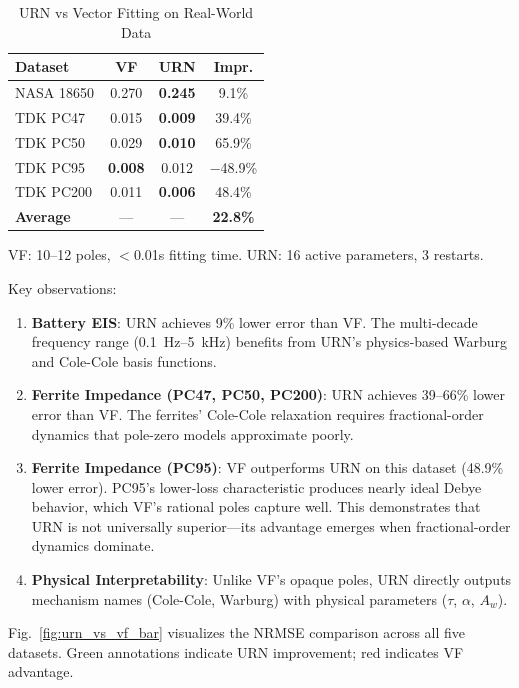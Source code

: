 \documentclass{ieeeaccess}
\begin{document}
\begin{table}[!t]
\caption{URN vs Vector Fitting on Real-World Data}
\label{tab:urn_vs_vf}
\centering
\footnotesize
\begin{tabular}{@{}lccc@{}}
\toprule
\textbf{Dataset} & \textbf{VF} & \textbf{URN} & \textbf{Impr.} \\
\midrule
NASA 18650 & 0.270 & \textbf{0.245} & 9.1\% \\
TDK PC47 & 0.015 & \textbf{0.009} & 39.4\% \\
TDK PC50 & 0.029 & \textbf{0.010} & 65.9\% \\
TDK PC95 & \textbf{0.008} & 0.012 & $-$48.9\% \\
TDK PC200 & 0.011 & \textbf{0.006} & 48.4\% \\
\midrule
\textbf{Average} & --- & --- & \textbf{22.8\%} \\
\bottomrule
\end{tabular}
\begin{flushleft}
\footnotesize{VF: 10--12 poles, $<$0.01s fitting time. URN: 16 active parameters, 3 restarts.}
\end{flushleft}
\end{table}

Key observations:
\begin{enumerate}
\item \textbf{Battery EIS}: URN achieves 9\% lower error than VF. The multi-decade frequency range (0.1~Hz--5~kHz) benefits from URN's physics-based Warburg and Cole-Cole basis functions.
\item \textbf{Ferrite Impedance (PC47, PC50, PC200)}: URN achieves 39--66\% lower error than VF. The ferrites' Cole-Cole relaxation requires fractional-order dynamics that pole-zero models approximate poorly.
\item \textbf{Ferrite Impedance (PC95)}: VF outperforms URN on this dataset (48.9\% lower error). PC95's lower-loss characteristic produces nearly ideal Debye behavior, which VF's rational poles capture well. This demonstrates that URN is not universally superior---its advantage emerges when fractional-order dynamics dominate.
\item \textbf{Physical Interpretability}: Unlike VF's opaque poles, URN directly outputs mechanism names (Cole-Cole, Warburg) with physical parameters ($\tau$, $\alpha$, $A_w$).
\end{enumerate}

Fig.~\ref{fig:urn_vs_vf_bar} visualizes the NRMSE comparison across all five datasets. Green annotations indicate URN improvement; red indicates VF advantage.
\end{document}
